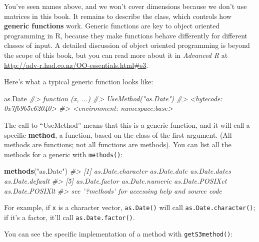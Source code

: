 \documentclass[]{book}
\newenvironment{Shaded}{\begin{snugshade}}{\end{snugshade}}
\newcommand{\KeywordTok}[1]{\textcolor[rgb]{0.13,0.29,0.53}{\textbf{{#1}}}}
\newcommand{\StringTok}[1]{\textcolor[rgb]{0.31,0.60,0.02}{{#1}}}
\newcommand{\CommentTok}[1]{\textcolor[rgb]{0.56,0.35,0.01}{\textit{{#1}}}}
\newcommand{\NormalTok}[1]{{#1}}
\begin{document}
You've seen names above, and we won't cover dimensions because we don't
use matrices in this book. It remains to describe the class, which
controls how \textbf{generic functions} work. Generic functions are key
to object oriented programming in R, because they make functions behave
differently for different classes of input. A detailed discussion of
object oriented programming is beyond the scope of this book, but you
can read more about it in \emph{Advanced R} at
\url{http://adv-r.had.co.nz/OO-essentials.html\#s3}.

Here's what a typical generic function looks like:

\begin{Shaded}
\begin{Highlighting}[]
\NormalTok{as.Date}
\CommentTok{#> function (x, ...) }
\CommentTok{#> UseMethod("as.Date")}
\CommentTok{#> <bytecode: 0x7fb9b5e62040>}
\CommentTok{#> <environment: namespace:base>}
\end{Highlighting}
\end{Shaded}

The call to ``UseMethod'' means that this is a generic function, and it
will call a specific \textbf{method}, a function, based on the class of
the first argument. (All methods are functions; not all functions are
methods). You can list all the methods for a generic with
\texttt{methods()}:

\begin{Shaded}
\begin{Highlighting}[]
\KeywordTok{methods}\NormalTok{(}\StringTok{"as.Date"}\NormalTok{)}
\CommentTok{#> [1] as.Date.character as.Date.date      as.Date.dates     as.Date.default  }
\CommentTok{#> [5] as.Date.factor    as.Date.numeric   as.Date.POSIXct   as.Date.POSIXlt  }
\CommentTok{#> see '?methods' for accessing help and source code}
\end{Highlighting}
\end{Shaded}

For example, if \texttt{x} is a character vector, \texttt{as.Date()}
will call \texttt{as.Date.character()}; if it's a factor, it'll call
\texttt{as.Date.factor()}.

You can see the specific implementation of a method with
\texttt{getS3method()}:
\end{document}
